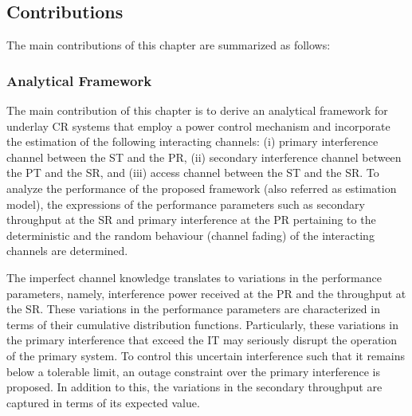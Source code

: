 \subsection{Contributions}
The main contributions of this chapter are summarized as follows: 
\subsubsection{Analytical Framework}
The main contribution of this chapter is to derive an analytical framework for underlay CR systems that employ a power control mechanism and incorporate the estimation of the following interacting channels: (i) primary interference channel between the ST and the PR, (ii) secondary interference channel between the PT and the SR, and (iii) access channel between the ST and the SR. To analyze the performance of the proposed framework (also referred as estimation model), the expressions of the performance parameters such as secondary throughput at the SR and primary interference at the PR pertaining to the deterministic and the random behaviour (channel fading) of the interacting channels are determined.%

The imperfect channel knowledge translates to variations in the performance parameters, namely, interference power received at the PR and the throughput at the SR. These variations in the performance parameters are characterized in terms of their cumulative distribution functions. Particularly, these variations in the primary interference that exceed the IT may seriously disrupt the operation of the primary system. To control this uncertain interference such that it remains below a tolerable limit, an outage constraint over the primary interference is proposed. In addition to this, the variations in the secondary throughput are captured in terms of its expected value. %
